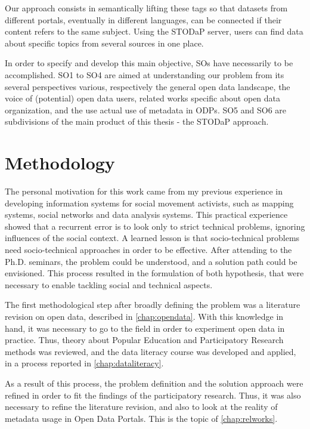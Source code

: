 {Our approach consists in semantically lifting these tags so that datasets from different portals, eventually in different languages, can be connected if their content refers to the same subject. 
Using the STODaP server, users can find data about specific topics from several sources in one place.

In order to specify and develop this main objective, SOs have necessarily to be accomplished.
SO1 to SO4 are aimed at understanding our problem from its several perspectives various, respectively the general open data landscape, the voice of (potential) open data users, related works specific about open data organization, and the use actual use of metadata in ODPs.
SO5 and SO6 are subdivisions of the main product of this thesis - the STODaP approach.



\section{Methodology}

The personal motivation for this work came from my previous experience in developing information systems for social movement activists, such as mapping systems, social networks and data analysis systems.
This practical experience showed that a recurrent error is to look only to strict technical problems, ignoring influences of the social context.
A learned lesson is that socio-technical problems need socio-technical approaches in order to be effective.
After attending to the Ph.D. seminars, the problem could be understood, and a solution path could be envisioned.
This process resulted in the formulation of both hypothesis, that were necessary to enable tackling social and technical aspects.

The first methodological step after broadly defining the problem was a literature revision on open data, described in \autoref{chap:opendata}.
With this knowledge in hand, it was necessary to go to the field in order to experiment open data in practice.
Thus, theory about Popular Education and Participatory Research methods was reviewed, and the data literacy course was developed and applied, in a process reported in \autoref{chap:dataliteracy}.

As a result of this process, the problem definition and the solution approach were refined in order to fit the findings of the participatory research.
Thus, it was also necessary to refine the literature revision, and also to look at the reality of metadata usage in Open Data Portals.
This is the topic of \autoref{chap:relworks}.

}
